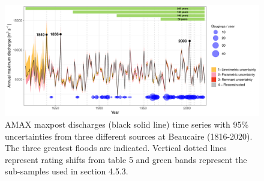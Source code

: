 \documentclass[11pt]{article}
\begin{document}
	
	\begin{figure}[h]
		\centering
		\includegraphics[width=1\linewidth]{Supplementary/IC_AMAX_Both_Bands.pdf}
	    \caption{AMAX maxpost discharges (black solid line) time series with 95\% uncertainties from three different sources at Beaucaire (1816-2020). The three greatest floods are indicated. Vertical dotted lines represent rating shifts from table 5 and green bands represent the sub-samples used in section 4.5.3.}
	    \label{fig:AMAX_Bands}
	\end{figure}
	
	
\end{document}
